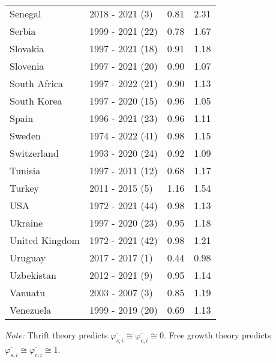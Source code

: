 \begin{table}[H]
{{\begin{tabular}{llrr}
Senegal & 2018 - 2021 (3) & 0.81 & 2.31\\
Serbia & 1999 - 2021 (22) & 0.78 & 1.67\\
\addlinespace
Slovakia & 1997 - 2021 (18) & 0.91 & 1.18\\
Slovenia & 1997 - 2021 (20) & 0.90 & 1.07\\
South Africa & 1997 - 2022 (21) & 0.90 & 1.13\\
South Korea & 1997 - 2020 (15) & 0.96 & 1.05\\
Spain & 1996 - 2021 (23) & 0.96 & 1.11\\
\addlinespace
Sweden & 1974 - 2022 (41) & 0.98 & 1.15\\
Switzerland & 1993 - 2020 (24) & 0.92 & 1.09\\
Tunisia & 1997 - 2011 (12) & 0.68 & 1.17\\
Turkey & 2011 - 2015 (5) & 1.16 & 1.54\\
USA & 1972 - 2021 (44) & 0.98 & 1.13\\
\addlinespace
Ukraine & 1997 - 2020 (23) & 0.95 & 1.18\\
United Kingdom & 1972 - 2021 (42) & 0.98 & 1.21\\
Uruguay & 2017 - 2017 (1) & 0.44 & 0.98\\
Uzbekistan & 2012 - 2021 (9) & 0.95 & 1.14\\
Vanuatu & 2003 - 2007 (3) & 0.85 & 1.19\\
\addlinespace
Venezuela & 1999 - 2019 (20) & 0.69 & 1.13\\
\bottomrule
\end{tabular}

}

}


\label{tbl-indicator_table}
\begin{flushleft}
\footnotesize \emph{Note:} Thrift theory predicts \(\overline{\varphi_{s,i}} \cong \overline{\varphi_{c,i}} \cong 0\). Free growth theory predicts \(\overline{\varphi_{s,i}} \cong \overline{\varphi_{c,i}} \cong 1\).
\end{flushleft}
\end{table}